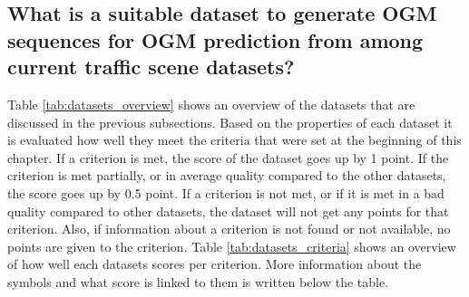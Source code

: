 \subsection{What is a suitable dataset to generate \gls{OGM} sequences for \gls{OGM} prediction from among current traffic scene datasets?} \label{subsec:data_con}
Table \ref{tab:datasets_overview} shows an overview of the datasets that are discussed in the previous subsections. Based on the properties of each dataset it is evaluated how well they meet the criteria that were set at the beginning of this chapter. If a criterion is met, the score of the dataset goes up by 1 point. If the criterion is met partially, or in average quality compared to the other datasets, the score goes up by 0.5 point. If a criterion is not met, or if it is met in a bad quality compared to other datasets, the dataset will not get any points for that criterion. Also, if information about a criterion is not found or not available, no points are given to the criterion. Table \ref{tab:datasets_criteria} shows an overview of how well each datasets scores per criterion. More information about the symbols and what score is linked to them is written below the table. \\

